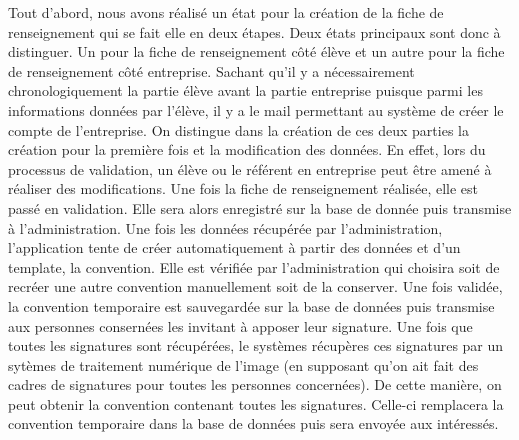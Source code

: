 \documentclass{scrreprt}
\begin{document}
	Tout d'abord, nous avons réalisé un état pour la création de la fiche de renseignement qui se fait elle en deux 
étapes. Deux états principaux sont donc à distinguer. Un pour la fiche de renseignement côté élève et un autre pour 
la fiche de renseignement côté entreprise. Sachant qu'il y a nécessairement chronologiquement la partie élève avant 
la partie entreprise puisque parmi les informations données par l'élève, il y a le mail permettant au système de 
créer le compte de l'entreprise. On distingue dans la création de ces deux parties la création pour la première fois et 
la modification des données. En effet, lors du processus de validation, un élève ou le référent en entreprise peut être 
amené à réaliser des modifications. 
	Une fois la fiche de renseignement réalisée, elle est passé en validation. Elle sera alors enregistré sur la base
de donnée puis transmise à l'administration. 
	Une fois les données récupérée par l'administration, l'application tente de créer automatiquement à partir des données
et d'un template, la convention. Elle est vérifiée par l'administration qui choisira soit de recréer une autre convention manuellement
soit de la conserver. 
	Une fois validée, la convention temporaire est sauvegardée sur la base de données puis transmise aux personnes consernées les invitant
à apposer leur signature. 
	Une fois que toutes les signatures sont récupérées, le systèmes récupères ces signatures par un sytèmes de traitement numérique de l'image 
(en supposant qu'on ait fait des cadres de signatures pour toutes les personnes concernées). De cette manière, on peut obtenir la convention contenant
toutes les signatures. Celle-ci remplacera la convention temporaire dans la base de données puis sera envoyée aux intéressés.  
\end{document}
